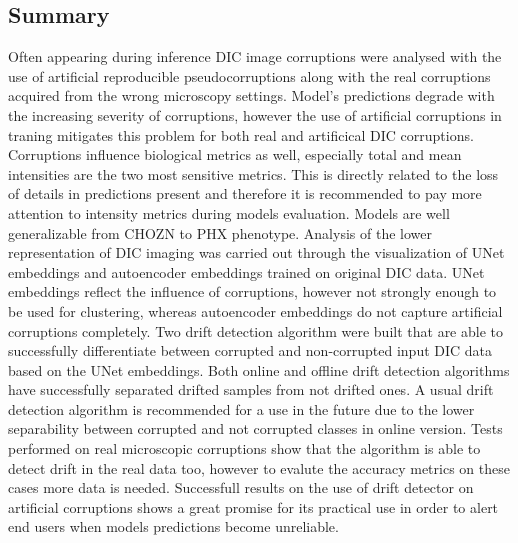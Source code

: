     \subsection{Summary}
    Often appearing during inference DIC image corruptions were analysed with the use of artificial reproducible pseudocorruptions along with the real corruptions acquired from the wrong microscopy settings. Model's predictions degrade with the increasing severity of corruptions, however the use of artificial corruptions in traning mitigates this problem for both real and artificical DIC corruptions. Corruptions influence biological metrics as well, especially total and mean intensities are the two most sensitive metrics. This is directly related to the loss of details in predictions present and therefore it is recommended to pay more attention to intensity metrics during models evaluation. Models are well generalizable from CHOZN to PHX phenotype. Analysis of the lower representation of DIC imaging was carried out through the visualization of UNet embeddings and autoencoder embeddings trained on original DIC data. UNet embeddings reflect the influence of corruptions, however not strongly enough to be used for clustering, whereas autoencoder embeddings do not capture artificial corruptions completely. Two drift detection algorithm were built that are able to successfully differentiate between corrupted and non-corrupted input DIC data based on the UNet embeddings. Both online and offline drift detection algorithms have successfully separated drifted samples from not drifted ones. A usual drift detection algorithm is recommended for a use in the future due to the lower separability between corrupted and not corrupted classes in online version. Tests performed on real microscopic corruptions show that the algorithm is able to detect drift in the real data too, however to evalute the accuracy metrics on these cases more data is needed. Successfull results on the use of drift detector on artificial corruptions shows a great promise for its practical use in order to alert end users when models predictions become unreliable.